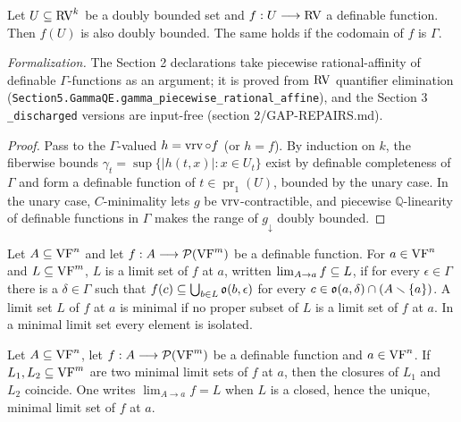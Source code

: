 \setcounter{theorem}{40}
\begin{lemma}
\label{db-to-db}
\leanok
{}
Let $U \subseteq \mathrm{RV}^k$ be a doubly bounded set and $f : U \longrightarrow \mathrm{RV}$ a definable function. Then $f(U)$ is also doubly bounded. The same holds if the codomain of $f$ is $\Gamma$.

\emph{Formalization.} The Section 2 declarations take piecewise rational-affinity of definable $\Gamma$-functions as an argument; it is proved from $\mathrm{RV}$ quantifier elimination (\texttt{Section5.GammaQE.gamma\_piecewise\_rational\_affine}), and the Section 3 \texttt{\_discharged} versions are input-free (section 2/GAP-REPAIRS.md).
\end{lemma}

\begin{proof}
\leanok
Pass to the $\Gamma$-valued $h = \operatorname{vrv} \circ f$ (or $h = f$). By induction on $k$, the fiberwise bounds $\gamma_t = \sup\{|h(t,x)| : x \in U_t\}$ exist by definable completeness of $\Gamma$ and form a definable function of $t \in \operatorname{pr}_1(U)$, bounded by the unary case. In the unary case, $C$-minimality lets $g$ be $\operatorname{vrv}$-contractible, and piecewise $\mathbb{Q}$-linearity of definable functions in $\Gamma$ makes the range of $g_{\downarrow}$ doubly bounded.
\end{proof}

\setcounter{theorem}{41}
\begin{definition}
\label{s2-limit-set}
\leanok
{}
Let $A \subseteq \mathrm{VF}^n$ and let $f : A \longrightarrow \mathcal{P}(\mathrm{VF}^m)$ be a definable function. For $a \in \mathrm{VF}^n$ and $L \subseteq \mathrm{VF}^m$, $L$ is a limit set of $f$ at $a$, written $\lim_{A \to a} f \subseteq L$, if for every $\epsilon \in \Gamma$ there is a $\delta \in \Gamma$ such that $f(c) \subseteq \bigcup_{b \in L} \mathfrak{o}(b, \epsilon)$ for every $c \in \mathfrak{o}(a,\delta) \cap (A \smallsetminus \{a\})$. A limit set $L$ of $f$ at $a$ is minimal if no proper subset of $L$ is a limit set of $f$ at $a$. In a minimal limit set every element is isolated.
\end{definition}

\setcounter{theorem}{42}
\begin{lemma}
\label{s2-minimal-limit-closure}
\leanok
{}
Let $A \subseteq \mathrm{VF}^n$, let $f : A \longrightarrow \mathcal{P}(\mathrm{VF}^m)$ be a definable function and $a \in \mathrm{VF}^n$. If $L_1, L_2 \subseteq \mathrm{VF}^m$ are two minimal limit sets of $f$ at $a$, then the closures of $L_1$ and $L_2$ coincide. One writes $\lim_{A \to a} f = L$ when $L$ is a closed, hence the unique, minimal limit set of $f$ at $a$.
\end{lemma}

